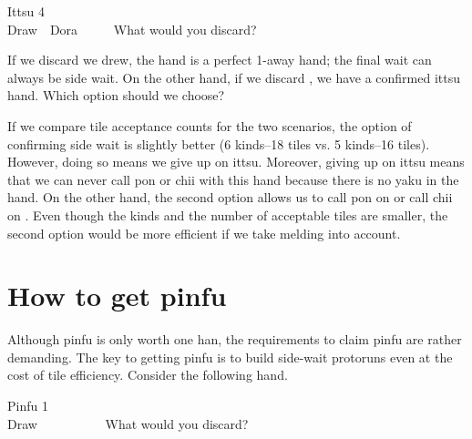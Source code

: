 \bigskip
\begin{itembox}[r]{{\jap Ittsu} 4}
\bp
{}~~\\
\hfill\footnotesize{Draw~~{\jap Dora}~~~~~}
\ep {}
\vspace{-15pt}What would you discard? \vspace{-5pt}
\end{itembox}

\bigskip
If we discard {\LARGE{}} we drew, the hand is a perfect 1-away hand; the final wait can always be side wait. On the other hand, if we discard {\LARGE{}}, we have a confirmed {\jap ittsu} hand. Which option should we choose?

\bigskip
If we compare tile acceptance counts for the two scenarios, the option of confirming side wait is slightly better (6 kinds--18 tiles vs. 5 kinds--16 tiles). However, doing so means we give up on {\jap ittsu}. Moreover, giving up on {\jap ittsu} means that we can never call {\jap pon} or {\jap chii} with this hand because there is no {\jap yaku} in the hand. On the other hand, the second option allows us to call {\jap pon} on {\LARGE{}} or call {\jap chii} on {\LARGE{}}. 
Even though the kinds and the number of acceptable tiles are smaller, the second option would be more efficient if we take melding into account. 

\newpage
\section{How to get {\jap pinfu}} \label{sec:pinfu}


Although {\jap pinfu} is only worth one {\jap han}, the requirements to claim {\jap pinfu} are rather demanding. The key to getting {\jap pinfu} is to build side-wait protoruns even at the cost of tile efficiency. Consider the following hand. 

\bigskip
\begin{itembox}[r]{{\jap Pinfu} 1}
\bp
{}~\\
\hfill\footnotesize{Draw~~~~~~~~~~}
\ep
\vspace{-17pt}What would you discard? \vspace{-5pt}
\end{itembox}


